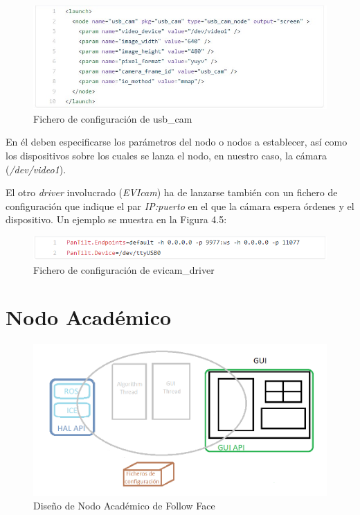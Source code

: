 \begin{figure}[H]
  \begin{center}
    \includegraphics[width=0.99\linewidth]{figures/usbcamconf.jpg}
		\caption{Fichero de configuración de usb\_cam}
		\label{fig.usbcamconf}
		\end{center}
\end{figure}

En él deben especificarse los parámetros del nodo o nodos a establecer, así como los dispositivos sobre los cuales se lanza el nodo, en nuestro caso, la cámara (\textit{/dev/video1}).

El otro \textit{driver} involucrado (\textit{EVIcam}) ha de lanzarse también con un fichero de configuración que indique el par \textit{IP:puerto} en el que la cámara espera órdenes y el dispositivo. Un ejemplo se muestra en la Figura 4.5:

\begin{figure}[H]
  \begin{center}
    \includegraphics[width=0.99\linewidth]{figures/evicamconf.png}
		\caption{Fichero de configuración de evicam\_driver}
		\label{fig.evicamconf}
		\end{center}
\end{figure}
 
\section{Nodo Académico}

\begin{figure}[H]
  \begin{center}
    \includegraphics[width=0.99\linewidth]{figures/nodoacademicoff.png}
		\caption{Diseño de Nodo Académico de Follow Face}
		\label{fig.nodoff}
		\end{center}
\end{figure}

